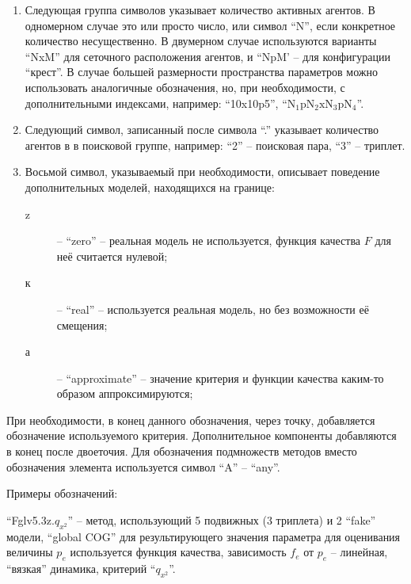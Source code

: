 \begin{enumerate}
\begin{description}
    \end{description}

  \item
    Следующая группа символов указывает количество активных агентов.
    В одномерном случае это или просто число, или символ ``N'', если
    конкретное количество несущественно. В двумерном случае
    используются варианты ``NxM'' для сеточного расположения агентов,
    и ``NpM'  -- для конфигурации ``крест''. В случае большей размерности
    пространства параметров можно использовать аналогичные обозначения,
    но, при необходимости, с дополнительными индексами, например:
    ``10x10p5'', ``$\mathrm{N_1 p N_2 x N_3 p N_4}$''.

  \item
    Следующий символ, записанный после символа ``.'' указывает количество агентов в
    в поисковой группе, например: ``2'' -- поисковая пара, ``3'' -- триплет.

  \item Восьмой символ, указываемый при необходимости, описывает
    поведение дополнительных моделей, находящихся на границе:
    \begin{description}

      \item[z]  -- ``zero'' -- реальная модель не используется, функция качества $F$ для неё считается нулевой;

      \item[к] -- ``real'' --  используется реальная модель, но без возможности её смещения;

      \item[а] -- ``approximate'' -- значение критерия и функции качества каким-то образом аппроксимируются;

    \end{description}

\end{enumerate}

При необходимости, в конец данного обозначения, через точку, добавляется обозначение используемого критерия.
Дополнительное компоненты добавляются в конец после двоеточия. Для обозначения подмножеств методов
вместо обозначения элемента используется символ ``A'' -- ``any''.


Примеры обозначений:

``Fglv5.3z.$q_{x^2}$'' -- метод, использующий 5 подвижных (3 триплета) и 2 ``fake'' модели,
``global COG'' для результирующего значения параметра
для оценивания величины $p_e$ используется функция качества,
зависимость $f_e$ от $p_e$ -- линейная, ``вязкая'' динамика, критерий ``$q_{x^2}$''.


